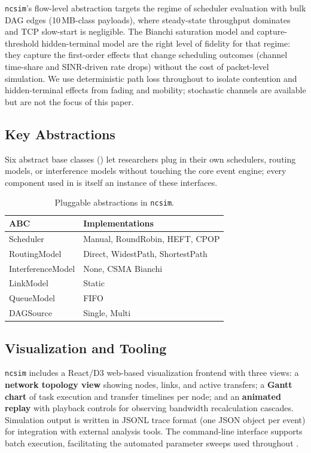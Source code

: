 \documentclass[conference]{IEEEtran}
\newcommand{\ncsim}{\texttt{ncsim}}
\begin{document}
\ncsim{}'s flow-level abstraction targets the regime of scheduler
evaluation with bulk DAG edges (10\,MB-class payloads), where
steady-state throughput dominates and TCP slow-start is negligible.  The
Bianchi saturation model and capture-threshold hidden-terminal model are
the right level of fidelity for that regime: they capture the
first-order effects that change scheduling outcomes (channel time-share
and SINR-driven rate drops) without the cost of packet-level simulation.
We use deterministic path loss throughout to isolate contention and
hidden-terminal effects from fading and mobility; stochastic channels
are available but are not the focus of this paper.

\subsection{Key Abstractions}

Six abstract base classes () let researchers plug
in their own schedulers, routing models, or interference models without
touching the core event engine; every component used in
 is itself an instance of these interfaces.

\begin{table}[t]
\centering
\caption{Pluggable abstractions in \ncsim{}.}
\label{tab:abstractions}
\begin{tabular}{@{}lp{4.8cm}@{}}
\toprule
\textbf{ABC} & \textbf{Implementations} \\
\midrule
Scheduler & Manual, RoundRobin, HEFT, CPOP \\
RoutingModel & Direct, WidestPath, ShortestPath \\
InterferenceModel & None, CSMA Bianchi \\
LinkModel & Static \\
QueueModel & FIFO \\
DAGSource & Single, Multi \\
\bottomrule
\end{tabular}
\end{table}

\subsection{Visualization and Tooling}
\label{sec:viz}

\ncsim{} includes a React/D3 web-based visualization frontend with three
views: a \textbf{network topology view} showing nodes, links, and active
transfers; a \textbf{Gantt chart} of task execution and transfer timelines
per node; and an \textbf{animated replay} with playback controls for
observing bandwidth recalculation cascades.  Simulation output is written
in JSONL trace format (one JSON object per event) for integration with
external analysis tools.  The command-line interface supports batch
execution, facilitating the automated parameter sweeps used throughout
.
\end{document}
